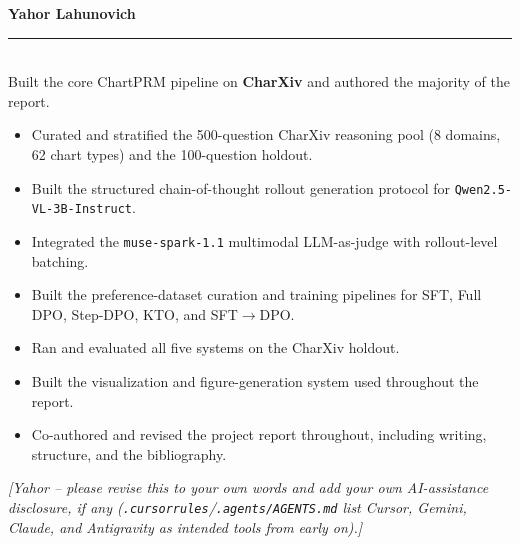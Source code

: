 \documentclass[11pt]{article}
\newcommand{\todo}[1]{\textcolor{todored}{\textit{[#1]}}}
\newcommand{\contribhead}[2]{%
  {\bfseries\color{accent}\large #1\ #2}\\[1pt]
  {\color{accent}\rule{\linewidth}{1.1pt}}\\[4pt]%
}
\begin{document}
\noindent
\begin{minipage}[t]{0.485\textwidth}
\contribhead{Yahor Lahunovich}{}
\small
Built the core ChartPRM pipeline on \textbf{CharXiv} and authored the majority of the report.
\begin{itemize}
  \item Curated and stratified the 500-question CharXiv reasoning pool (8 domains, 62 chart types) and the 100-question holdout.
  \item Built the structured chain-of-thought rollout generation protocol for \texttt{Qwen2.5-VL-3B-Instruct}.
  \item Integrated the \texttt{muse-spark-1.1} multimodal LLM-as-judge with rollout-level batching.
  \item Built the preference-dataset curation and training pipelines for SFT, Full DPO, Step-DPO, KTO, and SFT$\rightarrow$DPO.
  \item Ran and evaluated all five systems on the CharXiv holdout.
  \item Built the visualization and figure-generation system used throughout the report.
  \item Co-authored and revised the project report throughout, including writing, structure, and the bibliography.
\end{itemize}
\vspace{2pt}
\todo{Yahor -- please revise this to your own words and add your own AI-assistance disclosure, if any (\texttt{.cursorrules}/\texttt{.agents/AGENTS.md} list Cursor, Gemini, Claude, and Antigravity as intended tools from early on).}
\end{minipage}%
\hfill
\end{document}
